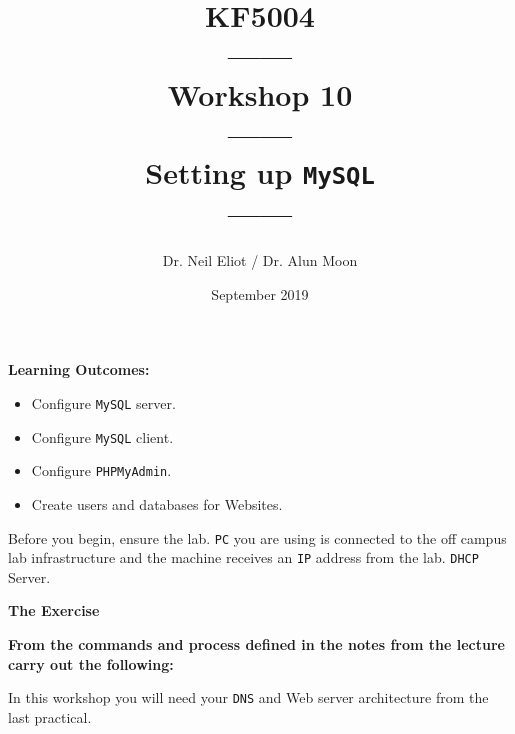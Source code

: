 \documentclass[11pt]{article}
\begin{document}
\author{Dr. Neil Eliot / Dr. Alun Moon}
\title{KF5004\\------\\Workshop 10\\------\\Setting up \texttt{MySQL}\\------}
\date{September 2019}
\maketitle

\newpage



\noindent\textbf{Learning Outcomes:}
\begin{itemize}
    \item Configure \texttt{MySQL} server.
    \item Configure \texttt{MySQL} client.
    \item Configure \texttt{PHPMyAdmin}.
    \item Create users and databases for Websites.
\end{itemize}


\begin{tcolorbox}[title={\textbf{Important:}}]
    Before you begin, ensure the lab. \texttt{PC} you are using is connected to the off campus lab infrastructure and the machine receives an \texttt{IP} address from the lab. \texttt{DHCP} Server.
\end{tcolorbox}
\newpage

\noindent\textbf{The Exercise}\\
\begin{tcolorbox}[colback=blue!20]
    \noindent\textbf{From the commands and process defined in the notes from the lecture carry out the following:}
\end{tcolorbox}


\begin{tcolorbox}[title={\textbf{NOTE:}}]
    In this workshop you will need your \texttt{DNS} and Web server architecture from the last practical.
\end{tcolorbox}
\end{document}
